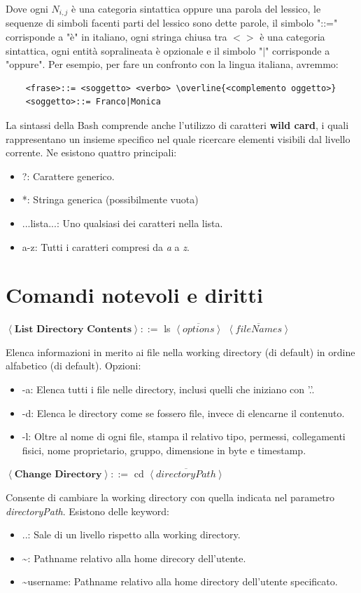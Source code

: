 \noindent Dove ogni $N_{i,j}$ è una categoria sintattica oppure una parola del lessico, le sequenze di simboli facenti parti del lessico sono dette
parole, il simbolo "::=" corrisponde a "è" in italiano, ogni stringa chiusa tra $<>$ è una categoria sintattica, ogni entità sopralineata è opzionale e
il simbolo "$|$" corrisponde a "oppure". Per esempio, per fare un confronto con la lingua italiana, avremmo: \begin{verbatim}
	<frase>::= <soggetto> <verbo> \overline{<complemento oggetto>}
	<soggetto>::= Franco|Monica
\end{verbatim}

\noindent La sintassi della Bash comprende anche l'utilizzo di caratteri \textbf{wild card}, i quali rappresentano un insieme specifico nel quale
ricercare elementi visibili dal livello corrente. Ne esistono quattro principali: \begin{itemize}
	\item ?: Carattere generico.
	\item *: Stringa generica (possibilmente vuota)
	\item \lbrack...lista...\rbrack : Uno qualsiasi dei caratteri nella lista.
	\item \lbrack a-z\rbrack : Tutti i caratteri compresi da \textit{a} a \textit{z}.
\end{itemize}

%

\section{Comandi notevoli e diritti}
$\left<\textbf{List Directory Contents}\right>::=$ ls $\overline{\left<options\right>}$ $\overline{\left<fileNames\right>}$\par
Elenca informazioni in merito ai file nella working directory (di default) in ordine alfabetico (di default). Opzioni: \begin{itemize}
	\item -a: Elenca tutti i file nelle directory, inclusi quelli che iniziano con '.'.
	\item -d: Elenca le directory come se fossero file, invece di elencarne il contenuto.
	\item -l: Oltre al nome di ogni file, stampa il relativo tipo, permessi, collegamenti fisici, nome proprietario, gruppo, dimensione in byte e
	timestamp.
\end{itemize}

\noindent$\left<\textbf{Change Directory}\right>::=$ cd $\overline{\left<directoryPath\right>}$\par
Consente di cambiare la working directory con quella indicata nel parametro \textit{directoryPath}. Esistono delle keyword: \begin{itemize}
	\item ..: Sale di un livello rispetto alla working directory.
	\item \textasciitilde: Pathname relativo alla home direcory dell'utente.
	\item \textasciitilde username: Pathname relativo alla home directory dell'utente specificato.
\end{itemize}

